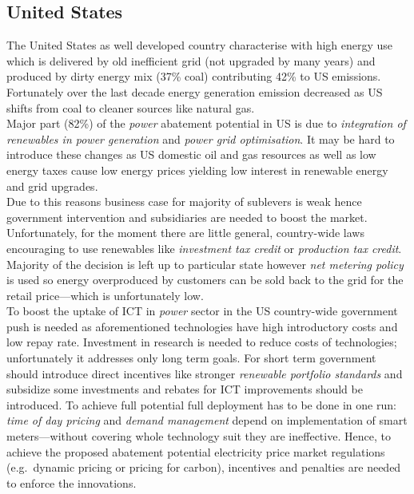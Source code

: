 \documentclass[11pt, twocolumn]{article}
\begin{document}
\subsection{United States}
The United States as well developed country characterise with high energy use which is delivered by old inefficient grid (not upgraded by many years) and produced by dirty energy mix (37\% coal) contributing 42\% to US emissions. Fortunately over the last decade energy generation emission decreased as US shifts from coal to cleaner sources like natural gas.\\
Major part (82\%) of the \emph{power} abatement potential in US is due to \emph{integration of renewables in power generation} and \emph{power grid optimisation}. It may be hard to introduce these changes as US domestic oil and gas resources as well as low energy taxes cause low energy prices yielding low interest in renewable energy and grid upgrades.\\
Due to this reasons business case for majority of sublevers is weak hence government intervention and subsidiaries are needed to boost the market. Unfortunately, for the moment there are little general, country-wide laws encouraging to use renewables like \emph{investment tax credit} or \emph{production tax credit}. Majority of the decision is left up to particular state however \emph{net metering policy} is used so energy overproduced by customers can be sold back to the grid for the retail price---which is unfortunately low.\\
To boost the uptake of ICT in \emph{power} sector in the US country-wide government push is needed as aforementioned technologies have high introductory costs and low repay rate. Investment in research is needed to reduce costs of technologies; unfortunately it addresses only long term goals. For short term government should introduce direct incentives like stronger \emph{renewable portfolio standards} and subsidize some investments and rebates for ICT improvements should be introduced. To achieve full potential full deployment has to be done in one run: \emph{time of day pricing} and \emph{demand management} depend on implementation of smart meters---without covering whole technology suit they are ineffective. Hence, to achieve the proposed abatement potential electricity price market regulations (e.g.\ dynamic pricing or pricing for carbon), incentives and penalties are needed to enforce the innovations.\\
\end{document}
